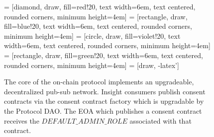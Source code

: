 \begin{figure}[ht] 
    \centering
     = [diamond, draw, fill=red!20, 
    text width=6em, text centered, rounded corners, minimum height=4em] 
     = [rectangle, draw, fill=blue!20, 
    text width=6em, text centered, rounded corners, minimum height=4em]
     = [circle, draw, fill=violet!20, 
        text width=6em, text centered, rounded corners, minimum height=4em]
     = [rectangle, draw, fill=green!20, 
        text width=6em, text centered, rounded corners, minimum height=4em]
     = [draw, -latex']
    
    \caption{The core of the on-chain protocol implements an upgradeable, decentralized pub-sub 
    network. Insight consumers publish consent contracts via the consent contract factory which is 
    upgradable by the Protocol DAO. The EOA which publishes a consent contract receives the 
    $DEFAULT\_ADMIN\_ROLE$ associated with that contract.}
    \label{fig:ConsentFactory}
  \end{figure}